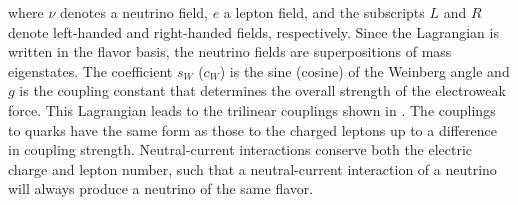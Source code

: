 where $\nu$ denotes a neutrino field, $e$ a lepton field, and the subscripts $L$ and $R$ denote left-handed and right-handed fields, respectively. Since the Lagrangian is written in the flavor basis, the neutrino fields are superpositions of mass eigenstates. The coefficient $s_W$ ($c_W$) is the sine (cosine) of the Weinberg angle and $g$ is the coupling constant that determines the overall strength of the electroweak force. This Lagrangian leads to the trilinear couplings shown in . The couplings to quarks have the same form as those to the charged leptons up to a difference in coupling strength. Neutral-current interactions conserve both the electric charge and lepton number, such that a neutral-current interaction of a neutrino will always produce a neutrino of the same flavor.

